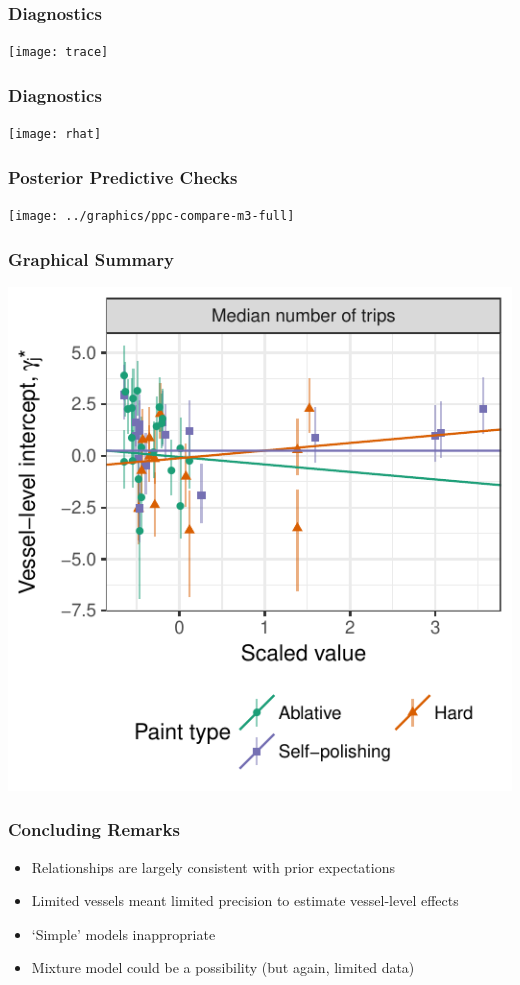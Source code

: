 \documentclass[aspectratio=169]{beamer}
\begin{document}

\begin{frame}
  \frametitle{Diagnostics}
  \centering
  \texttt{[image: trace]}
\end{frame}

\begin{frame}
  \frametitle{Diagnostics}
  \centering
  \texttt{[image: rhat]}
\end{frame}

\begin{frame}
  \frametitle{Posterior Predictive Checks}
  \centering
  \texttt{[image: ../graphics/ppc-compare-m3-full]}
\end{frame}

\begin{frame}
  \frametitle{Graphical Summary}
  \centering
  \includegraphics[height=0.8\paperheight]{../graphics/plM3paint-t}
\end{frame}

\begin{frame}
  \frametitle{Concluding Remarks}
  \begin{itemize}
  \item Relationships are largely consistent with prior expectations
  \item Limited vessels meant limited precision to estimate vessel-level effects
  \item `Simple' models inappropriate
  \item Mixture model could be a possibility (but again, limited data)
  \end{itemize}
\end{frame}
\end{document}
